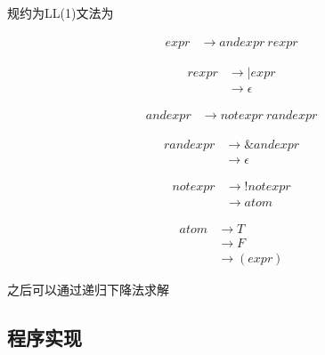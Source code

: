 \documentclass[UTF8]{ctexart}
\begin{document}
      规约为LL(1)文法为

      \begin{equation}
      \begin{aligned}
      expr &\rightarrow andexpr \  rexpr
      \end{aligned}
      \end{equation}

      \begin{equation}
      \begin{aligned}
      rexpr &\rightarrow | expr \\
            &\rightarrow \epsilon
      \end{aligned}
      \end{equation}

      \begin{equation}
      \begin{aligned}
      andexpr &\rightarrow notexpr \  randexpr
      \end{aligned}
      \end{equation}

      \begin{equation}
      \begin{aligned}
      randexpr &\rightarrow \& andexpr \\
               &\rightarrow \epsilon
      \end{aligned}
      \end{equation}

      \begin{equation}
      \begin{aligned}
      notexpr &\rightarrow ! notexpr \\
              &\rightarrow atom
      \end{aligned}
      \end{equation}

      \begin{equation}
      \begin{aligned}
      atom &\rightarrow T \\
           &\rightarrow F \\
           &\rightarrow (expr)
      \end{aligned}
      \end{equation}

      之后可以通过递归下降法求解

    \subsection{程序实现}
      \inputminted{java}{src/sylxjtu/BoolEquationEvaluate.java}
\end{document}

